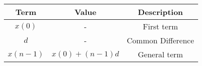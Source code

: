 \begin{tabular}{|c|c|c|}
    \hline
    \textbf{Term} & \textbf{Value} & \textbf{Description}\\
    \hline
    $x(0)$ & - & First term\\
    \hline
    $d$ & - & Common Difference\\
    \hline
    $x(n-1)$ & $x(0)+(n-1)d$ & General term\\
    \hline
  \end{tabular}
  
